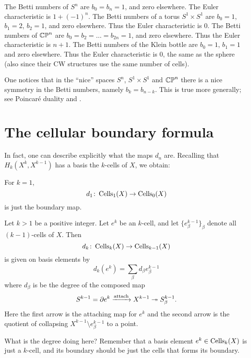 \begin{example}
	\listhack
	\begin{enumerate}[(a)]
		\ii The Betti numbers of $S^n$ are $b_0 = b_n = 1$,
		and zero elsewhere. The Euler characteristic is $1 + (-1)^n$.
		\ii The Betti numbers of a torus $S^1 \times S^1$
		are $b_0 = 1$, $b_1 = 2$, $b_2 = 1$, and zero elsewhere.
		Thus the Euler characteristic is $0$.
		\ii The Betti numbers of $\mathbb{CP}^n$ are $b_0 = b_2 = \dots = b_{2n} = 1$,
		and zero elsewhere. Thus the Euler characteristic is $n+1$.
		\ii The Betti numbers of the Klein bottle
		are $b_0 = 1$, $b_1 = 1$ and zero elsewhere.
		Thus the Euler characteristic is $0$, the same as the sphere
		(also since their CW structures use the same number of cells).
	\end{enumerate}
	One notices that in the ``nice'' spaces $S^n$, $S^1 \times S^1$ and $\mathbb{CP}^n$
	there is a nice symmetry in the Betti numbers, namely $b_k = b_{n-k}$.
	This is true more generally; see Poincar\'e duality and .
\end{example}

\section{The cellular boundary formula}
In fact, one can describe explicitly what the maps $d_n$ are.
Recalling that $H_k(X^k, X^{k-1})$ has a basis the $k$-cells of $X$, we obtain:
\begin{theorem}
	[Cellular boundary formula for $k=1$]
	For $k=1$, \[ d_1 \colon \operatorname{Cells}_1(X) \to \operatorname{Cells}_0(X) \] is just the boundary map.
\end{theorem}
\begin{theorem}
	Let $k > 1$ be a positive integer.
	Let $e^k$ be an $k$-cell, and let $\{e_\beta^{k-1}\}_\beta$
	denote all $(k-1)$-cells of $X$.
	Then \[ d_k \colon \operatorname{Cells}_k(X) \to \operatorname{Cells}_{k-1}(X) \]
	is given on basis elements by
	\[ d_k(e^k) = \sum_\beta d_\beta e_\beta^{k-1} \]
	where $d_\beta$ is be the degree of the composed map
	\[ S^{k-1} = \partial e^k \xrightarrow{\text{attach}}
		X^{k-1} \twoheadrightarrow S_\beta^{k-1}. \]
	Here the first arrow is the attaching map for $e^k$
	and the second arrow is the quotient of collapsing
	$X^{k-1} \setminus e^{k-1}_\beta$ to a point.
\end{theorem}

What is the degree doing here? Remember that a basis element $e^k \in \operatorname{Cells}_k(X)$ is just a
$k$-cell, and its boundary should be just the cells that forms its boundary.

